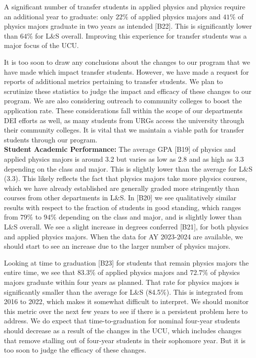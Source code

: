 \documentclass[12pt]{article}
\begin{document}
A significant number of transfer students in applied physics and
physics require an additional year to graduate: only $22\%$ of applied
physics majors and $41\%$ of physics majors graduate in two years as
intended [B22].  This is significantly lower than $64\%$ for L\&S
overall.  Improving this experience for transfer students was a major
focus of the UCU.

It is too soon to draw any conclusions about the changes to our
program that we have made which impact transfer students.  However, we
have made a request for reports of additional metrics pertaining to
transfer students.  We plan to scrutinize these statistics to judge
the impact and efficacy of these changes to our program.  We are also
considering outreach to community colleges to boost the application
rate.  These considerations fall within the scope of our departments
DEI efforts as well, as many students from URGs access the university
through their community colleges.  It is vital that we maintain a
viable path for transfer students through our program.\\[3pt]

\noindent
{\bf Student Academic Performance:} The average GPA [B19] of physics
and applied physics majors is around 3.2 but varies as low as 2.8 and
as high as 3.3 depending on the class and major.  This is slightly
lower than the average for L\&S (3.3).  This likely reflects the fact
that physics majors take more physics courses, which we have already
established are generally graded more stringently than courses from
other departments in L\&S.  In [B20] we see qualitatively similar
results with respect to the fraction of students in good standing,
which ranges from $79\%$ to $94\%$ depending on the class and major,
and is slightly lower than L\&S overall.  We see a slight increase in
degrees conferred [B21], for both physics and applied physics majors.
When the data for AY 2023-2024 are available, we should start to see
an increase due to the larger number of physics majors.

Looking at time to graduation [B23] for students that remain physics
majors the entire time, we see that $83.3\%$ of applied physics majors
and $72.7\%$ of physics majors graduate within four years as planned.
That rate for physics majors is significantly smaller than the average
for L\&S (84.5\%).  This is integrated from 2016 to 2022, which makes
it somewhat difficult to interpret.  We should monitor this metric
over the next few years to see if there is a persistent problem here
to address.  We do expect that time-to-graduation for nominal
four-year students should decrease as a result of the changes in the
UCU, which includes changes that remove stalling out of four-year
students in their sophomore year.  But it is too soon to judge the
efficacy of these changes.\\[3pt]
\end{document}
